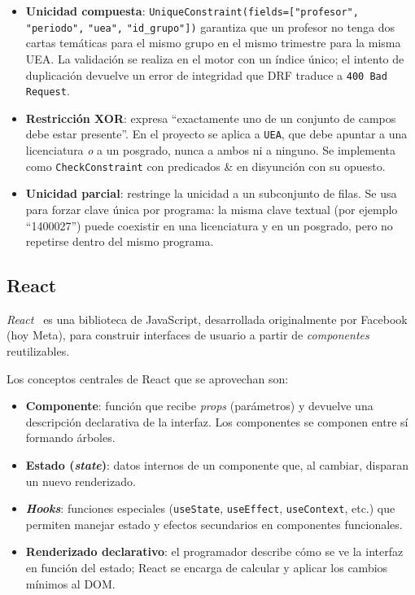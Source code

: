 \begin{itemize}
    \item \textbf{Unicidad compuesta}: \texttt{UniqueConstraint(fields=[\allowbreak"profesor",} \texttt{"periodo",} \texttt{"uea",} \texttt{"id\_grupo"])} garantiza que un profesor no tenga dos cartas temáticas para el mismo grupo en el mismo trimestre para la misma UEA. La validación se realiza en el motor con un índice único; el intento de duplicación devuelve un error de integridad que DRF traduce a \texttt{400 Bad Request}.
    \item \textbf{Restricción XOR}: expresa ``exactamente uno de un conjunto de campos debe estar presente''. En el proyecto se aplica a \texttt{UEA}, que debe apuntar a una licenciatura \emph{o} a un posgrado, nunca a ambos ni a ninguno. Se implementa como \texttt{CheckConstraint} con predicados  \&  en disyunción con su opuesto.
    \item \textbf{Unicidad parcial}:  restringe la unicidad a un subconjunto de filas. Se usa para forzar clave única por programa: la misma clave textual (por ejemplo ``1400027'') puede coexistir en una licenciatura y en un posgrado, pero no repetirse dentro del mismo programa.
\end{itemize}

\subsection{React}

\emph{React}~\cite{reactdocs} es una biblioteca de JavaScript, desarrollada originalmente por Facebook (hoy Meta), para construir interfaces de usuario a partir de \emph{componentes} reutilizables.

Los conceptos centrales de React que se aprovechan son:

\begin{itemize}
    \item \textbf{Componente}: función que recibe \emph{props} (parámetros) y devuelve una descripción declarativa de la interfaz. Los componentes se componen entre sí formando árboles.
    \item \textbf{Estado (\emph{state})}: datos internos de un componente que, al cambiar, disparan un nuevo renderizado.
    \item \textbf{\emph{Hooks}}: funciones especiales (\texttt{useState}, \texttt{useEffect}, \texttt{useContext}, etc.) que permiten manejar estado y efectos secundarios en componentes funcionales.
    \item \textbf{Renderizado declarativo}: el programador describe cómo se ve la interfaz en función del estado; React se encarga de calcular y aplicar los cambios mínimos al DOM.
\end{itemize}

